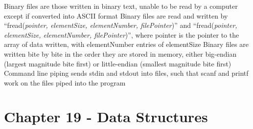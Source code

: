 \documentclass[11 pt, twoside]{article}
\newenvironment{outline*}
{
	\begin{outline}[enumerate]
	}
	{\end{outline}
}
\begin{document}
\begin{outline*}
\1 Binary files are those written in binary text, unable to be read by a computer except if converted into ASCII format
\2 Binary files are read and written by ``fread(\textit{pointer, elementSize, elementNumber, filePointer})'' and ``fread(\textit{pointer, elementSize, elementNumber, filePointer})'', where pointer is the pointer to the array of data written, with elementNumber entries of elementSize
\2 Binary files are written bite by bite in the order they are stored in memory, either big-endian (largest magnitude bite first) or little-endian (smallest magnitude bite first)
\1 Command line piping sends stdin and stdout into files, such that scanf and printf work on the files piped into the program
\end{outline*}
\section{Chapter 19 - Data Structures}
\end{document}

